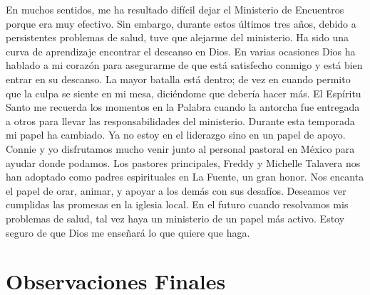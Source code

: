 \documentclass[twoside, 12pt]{book}
\begin{document}
En muchos sentidos, me ha resultado difícil dejar el Ministerio de Encuentros porque era muy efectivo.  Sin embargo, durante estos últimos tres años, debido a persistentes problemas de salud, tuve que alejarme del ministerio. Ha sido una curva de aprendizaje encontrar el descanso en Dios. En varias ocasiones Dios ha hablado a mi corazón para asegurarme de que está satisfecho conmigo y está bien entrar en su descanso. La mayor batalla está dentro; de vez en cuando permito que la culpa se siente en mi mesa, diciéndome que debería hacer más. El Espíritu Santo me recuerda los momentos en la Palabra cuando la antorcha fue entregada a otros para llevar las responsabilidades del ministerio. Durante esta temporada mi papel ha cambiado. Ya no estoy en el liderazgo sino en un papel de apoyo.  Connie y yo disfrutamos mucho venir junto al personal pastoral en México para ayudar donde podamos. Los pastores principales, Freddy y Michelle Talavera nos han adoptado como padres espirituales en La Fuente, un gran honor.  Nos encanta el papel de orar, animar, y apoyar a los demás con sus desafíos.  Deseamos ver cumplidas las promesas en la iglesia local.  En el futuro cuando resolvamos mis problemas de salud, tal vez haya un ministerio de un papel más activo.  Estoy seguro de que Dios me enseñará lo que quiere que haga.\\


\clearpage


\chapter{Observaciones Finales}
\
\end{document}
